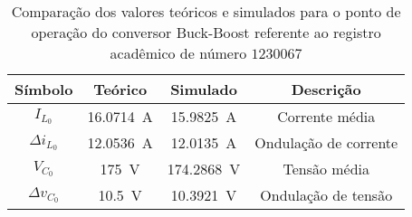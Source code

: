 \begin{table}[!ht]
\centering
\caption{Comparação dos valores teóricos e simulados para o ponto de operação do conversor Buck-Boost referente ao registro acadêmico de número $1230067$}
\label{tab:steadystatesim}
\begin{tabular}{@{}cccc@{}}
\toprule
\textbf{Símbolo} & \textbf{Teórico} & \textbf{Simulado} & \textbf{Descrição}\\ \midrule
$I_{L_0}$ & \SI{16.0714}{\A} & \SI{15.9825}{\A} & Corrente média\\
$\Delta{i_{L_0}}$  & \SI{12.0536}{\A} & \SI{12.0135}{\A}& Ondulação de corrente\\
$V_{C_0}$ & \SI{175}{\V} & \SI{174.2868}{\V} & Tensão média\\
$\Delta{v_{C_0}}$  & \SI{10.5}{\V} & \SI{10.3921}{\V}& Ondulação de tensão \\
\bottomrule
\end{tabular}
\end{table}


